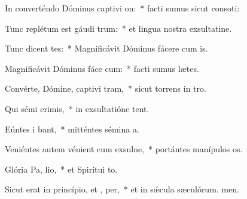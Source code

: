 \item In converténdo Dóminus captivi on:~* facti sumus sicut consoti:
\item Tunc replétum est gáudi  trum:~* et lingua nostra exsultatine.
\item Tunc dicent  tes:~* Magnificávit Dóminus fácere cum is.
\item Magnificávit Dóminus fáce cum:~* facti sumus lætes.
\item Convérte, Dómine, captivi tram,~* sicut torrens in tro.
\item Qui sémi  crimis,~* in exsultatióne tent.
\item Eúntes i  bant,~* mitténtes sémina a.
\item Veniéntes autem vénient cum exsulne,~* portántes manípulos os.
\item Glória Pa,  lio,~* et Spirítui to.
\item Sicut erat in princípio, et ,  per,~* et in sǽcula sæculórum. men.
